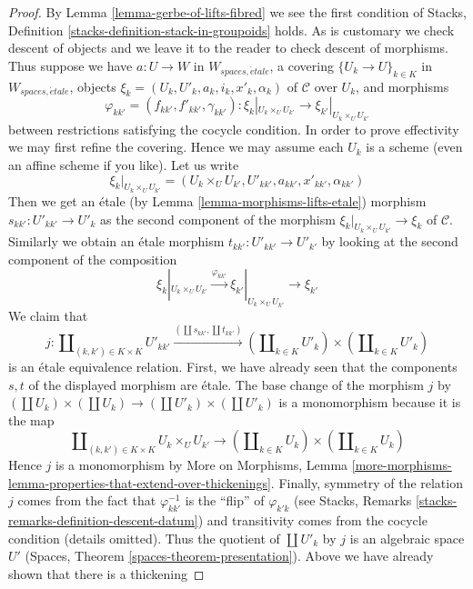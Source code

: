 \documentclass[10pt,a4paper]{amsart}
\theoremstyle{plain}
\theoremstyle{definition}
\theoremstyle{remark}
\numberwithin{equation}{subsection}
\def\etale{{\acute{e}tale}}
\begin{document}
\begin{proof}
By Lemma \ref{lemma-gerbe-of-lifts-fibred} we see the first condition
of Stacks, Definition \ref{stacks-definition-stack-in-groupoids} holds.
As is customary we check descent of objects and we leave it to the reader
to check descent of morphisms. Thus suppose we have $a : U \to W$
in $W_{spaces, \etale}$, a covering $\{U_k \to U\}_{k \in K}$ in
$W_{spaces, \etale}$, objects $\xi_k = (U_k, U'_k, a_k, i_k, x'_k, \alpha_k)$
of $\mathcal{C}$ over $U_k$, and morphisms
$$
\varphi_{kk'} = (f_{kk'}, f'_{kk'}, \gamma_{kk'}) :
\xi_k|_{U_k \times_U U_{k'}} \to
\xi_{k'}|_{U_k \times_U U_{k'}}
$$
between restrictions satisfying the cocycle condition. In order to prove
effectivity we may first refine the covering. Hence we may assume each
$U_k$ is a scheme (even an affine scheme if you like). Let us write
$$
\xi_k|_{U_k \times_U U_{k'}} =
(U_k \times_U U_{k'}, U'_{kk'}, a_{kk'}, x'_{kk'}, \alpha_{kk'})
$$
Then we get an \'etale (by Lemma \ref{lemma-morphisms-lifts-etale}) morphism
$s_{kk'} : U'_{kk'} \to U'_k$
as the second component of the morphism
$\xi_k|_{U_k \times_U U_{k'}} \to \xi_k$ of $\mathcal{C}$.
Similarly we obtain an \'etale morphism $t_{kk'} : U'_{kk'} \to U'_{k'}$
by looking at the second component of the composition
$$
\xi_k|_{U_k \times_U U_{k'}} \xrightarrow{\varphi_{kk'}}
\xi_{k'}|_{U_k \times_U U_{k'}} \to \xi_{k'}
$$
We claim that
$$
j :
\coprod\nolimits_{(k, k') \in K \times K} U'_{kk'}
\xrightarrow{(\coprod s_{kk'}, \coprod t_{kk'})}
(\coprod\nolimits_{k \in K} U'_k) \times (\coprod\nolimits_{k \in K} U'_k)
$$
is an \'etale equivalence relation. First, we have already seen
that the components $s, t$ of the displayed morphism are \'etale.
The base change of the morphism $j$ by
$(\coprod U_k) \times (\coprod U_k) \to (\coprod U'_k) \times (\coprod U'_k)$
is a monomorphism because it is the map
$$
\coprod\nolimits_{(k, k') \in K \times K} U_k \times_U U_{k'}
\longrightarrow
(\coprod\nolimits_{k \in K} U_k) \times (\coprod\nolimits_{k \in K} U_k)
$$
Hence $j$ is a monomorphism by More on Morphisms, Lemma
\ref{more-morphisms-lemma-properties-that-extend-over-thickenings}.
Finally, symmetry of the relation $j$ comes from the fact that
$\varphi_{kk'}^{-1}$ is the ``flip'' of $\varphi_{k'k}$ (see
Stacks, Remarks \ref{stacks-remarks-definition-descent-datum})
and transitivity comes from the cocycle condition (details omitted).
Thus the quotient of $\coprod U'_k$ by $j$ is an algebraic space $U'$
(Spaces, Theorem \ref{spaces-theorem-presentation}).
Above we have already shown that there is a thickening

\end{proof}
\end{document}
